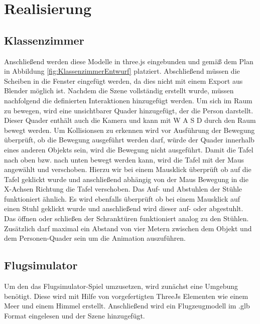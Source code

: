 \section{Realisierung}
\subsection{Klassenzimmer}
Anschließend werden diese Modelle in three.js eingebunden und gemäß dem Plan in Abbildung \ref{fig:KlassenzimmerEntwurf}
platziert.
Abschließend müssen die Scheiben in die Fenster eingefügt werden, da dies nicht mit einem Export aus Blender möglich ist.
\newparagraph
Nachdem die Szene vollständig erstellt wurde, müssen nachfolgend die definierten Interaktionen hinzugefügt werden.
Um sich im Raum zu bewegen, wird eine unsichtbarer Quader hinzugefügt, der die Person darstellt. Dieser Quader enthält auch die Kamera
und kann mit W A S D durch den Raum bewegt werden. Um Kollisionsen zu erkennen wird vor Ausführung der Bewegung überprüft,
ob die Bewegung ausgeführt werden darf, würde der Quader innerhalb eines anderen Objekts sein, wird die Bewegung nicht ausgeführt.
\newparagraph
Damit die Tafel nach oben bzw. nach unten bewegt werden kann, wird die Tafel mit der Maus angewählt und verschoben.
Hierzu wir bei einem Mausklick überprüft ob auf die Tafel geklickt wurde und anschließend abhängig von der Maus Bewegung in die X-Achsen Richtung die Tafel verschoben.
Das Auf- und Abstuhlen der Stühle funktioniert ähnlich. Es wird ebenfalls überprüft ob bei einem Mausklick auf einen Stuhl geklickt wurde und anschließend wird dieser auf- oder abgestuhlt.
Das öffnen oder schließen der Schranktüren funktioniert analog zu den Stühlen.
Zusätzlich darf maximal ein Abstand von vier Metern zwischen dem Objekt und dem Personen-Quader sein um die Animation auszuführen.
\subsection{Flugsimulator}

Um den das Flugsimulator-Spiel umzusetzen, wird zunächst eine Umgebung benötigt.
Diese wird mit Hilfe von vorgefertigten ThreeJs Elementen wie einem Meer und einem Himmel erstellt.
Anschließend wird ein Flugzeugmodell im .glb Format eingelesen und der Szene hinzugefügt.


